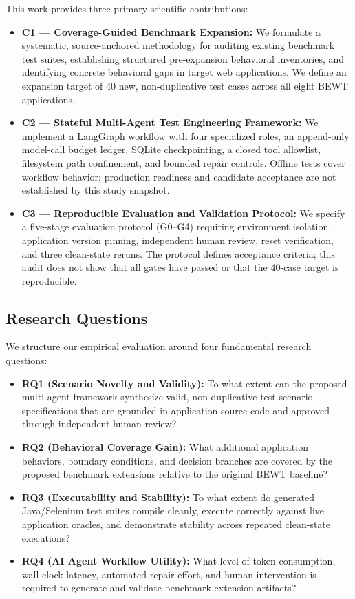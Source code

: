 \documentclass[pdflatex,sn-mathphys-num]{sn-jnl}
\begin{document}
This work provides three primary scientific contributions:
\begin{itemize}
    \item \textbf{C1 --- Coverage-Guided Benchmark Expansion:} We formulate a systematic, source-anchored methodology for auditing existing benchmark test suites, establishing structured pre-expansion behavioral inventories, and identifying concrete behavioral gaps in target web applications. We define an expansion target of 40 new, non-duplicative test cases across all eight BEWT applications.
    \item \textbf{C2 --- Stateful Multi-Agent Test Engineering Framework:} We implement a LangGraph workflow with four specialized roles, an append-only model-call budget ledger, SQLite checkpointing, a closed tool allowlist, filesystem path confinement, and bounded repair controls. Offline tests cover workflow behavior; production readiness and candidate acceptance are not established by this study snapshot.
    \item \textbf{C3 --- Reproducible Evaluation and Validation Protocol:} We specify a five-stage evaluation protocol (G0--G4) requiring environment isolation, application version pinning, independent human review, reset verification, and three clean-state reruns. The protocol defines acceptance criteria; this audit does not show that all gates have passed or that the 40-case target is reproducible.
\end{itemize}

\subsection{Research Questions}

We structure our empirical evaluation around four fundamental research questions:
\begin{itemize}
    \item \textbf{RQ1 (Scenario Novelty and Validity):} To what extent can the proposed multi-agent framework synthesize valid, non-duplicative test scenario specifications that are grounded in application source code and approved through independent human review?
    \item \textbf{RQ2 (Behavioral Coverage Gain):} What additional application behaviors, boundary conditions, and decision branches are covered by the proposed benchmark extensions relative to the original BEWT baseline?
    \item \textbf{RQ3 (Executability and Stability):} To what extent do generated Java/Selenium test suites compile cleanly, execute correctly against live application oracles, and demonstrate stability across repeated clean-state executions?
    \item \textbf{RQ4 (AI Agent Workflow Utility):} What level of token consumption, wall-clock latency, automated repair effort, and human intervention is required to generate and validate benchmark extension artifacts?
\end{itemize}
\end{document}
